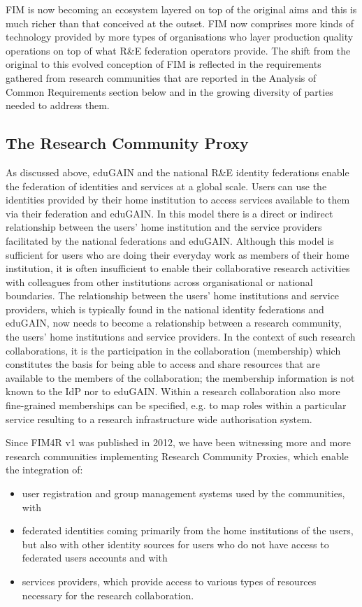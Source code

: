 \documentclass[fleqn,10pt]{wlscirep}
\begin{document}
{FIM is now becoming an ecosystem layered on top of the original aims and this is much richer than that conceived at the outset. FIM now comprises more kinds of technology provided by more types of organisations who layer production quality operations on top of what R\&E federation operators provide. The shift from the original to this evolved conception of FIM is reflected in the requirements gathered from research communities that are reported in the Analysis of Common Requirements section below and in the growing diversity of parties needed to address them.

\subsection{The Research Community Proxy}
As discussed above, eduGAIN and the national R\&E identity federations enable the federation of identities and services at a global scale. Users can use the identities provided by their home institution to access services available to them via their federation and eduGAIN. In this model there is a direct or indirect relationship between the users’ home institution and the service providers facilitated by the national federations and eduGAIN. Although this model is sufficient for users who are doing their everyday work as members of their home institution, it is often insufficient to enable their collaborative research activities with colleagues from other institutions across organisational or national boundaries. The relationship between the users' home institutions and service providers, which is typically found in the national identity federations and eduGAIN, now needs to become a relationship between a research community, the users' home institutions and service providers. In the context of such research collaborations, it is the participation in the collaboration (membership) which constitutes the basis for being able to access and share resources that are available to the members of the collaboration; the membership information is not known to the IdP nor to eduGAIN.  Within a research collaboration also more fine-grained memberships can be specified, e.g. to map roles within a particular service resulting to a research infrastructure wide authorisation system.

Since FIM4R v1 was published in 2012, we have been witnessing more and more research communities implementing Research Community Proxies, which enable the integration of:
\begin{itemize}
  \item user registration and group management systems used by the communities, with 
  \item federated identities coming primarily from the home institutions of the users, but also with other identity sources for users who do not have access to federated users accounts and with 
  \item services providers, which provide access to various types of resources necessary for the research collaboration. 
\end{itemize}

}
\end{document}
